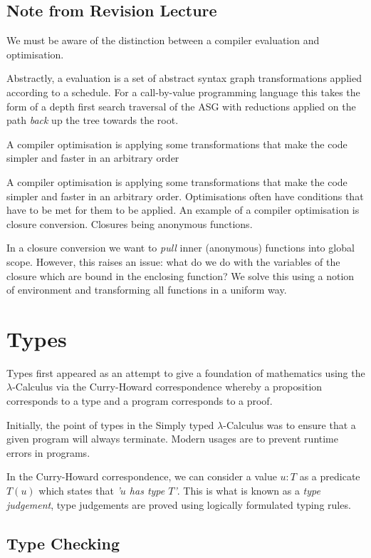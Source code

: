 \documentclass{article}
\renewcommand{\i}[1]{\textit{#1}}
\begin{document}
\subsection{Note from Revision Lecture}
We must be aware of the distinction between a compiler evaluation and optimisation.

Abstractly, a evaluation is a set of abstract syntax graph transformations applied according to a schedule. For a call-by-value programming language this takes the form of a depth first search traversal of the ASG with reductions applied on the path \textit{back} up the tree towards the root.

A compiler optimisation is applying some transformations that make the code simpler and faster in an arbitrary order

A compiler optimisation is applying some transformations that make the code simpler and faster in an arbitrary order. Optimisations often have conditions that have to be met for them to be applied.
An example of a compiler optimisation is closure conversion. Closures being anonymous functions.

In a closure conversion we want to \textit{pull} inner (anonymous) functions into global scope. However, this raises an issue: what do we do with the variables of the closure which are bound in the enclosing function? We solve this using a notion of environment and transforming all functions in a uniform way.


\section{Types}

Types first appeared as an attempt to give a foundation of mathematics using the $\lambda$-Calculus via the Curry-Howard correspondence whereby a proposition corresponds to a type and a program corresponds to a proof.

Initially, the point of types in the Simply typed $\lambda$-Calculus was to ensure that a given program will always terminate. Modern usages are to prevent runtime errors in programs.

In the Curry-Howard correspondence, we can consider a value $u : T$ as a predicate $T(u)$ which states that \i{'$u$ has type $T$'}. This is what is known as a \i{type judgement}, type judgements are proved using logically formulated typing rules.

\subsection{Type Checking}
\end{document}
